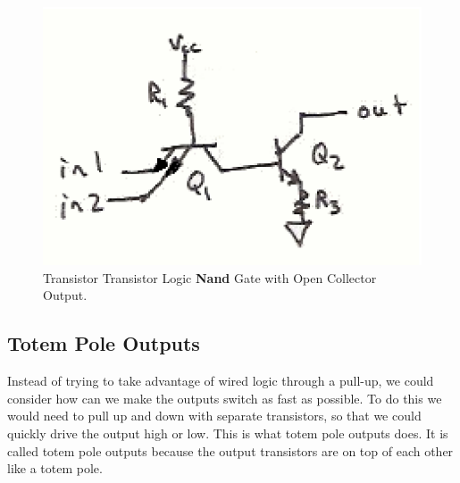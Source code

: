 \begin{figure}
\begin{center}
\caption{Transistor Transistor Logic \textbf{Nand} Gate with Open Collector Output.}\label{f:TTL_nand_opencollector}
\includegraphics{images/TTLnand_opencollector.eps}
\end{center}
\end{figure}

\subsection{Totem Pole Outputs}
Instead of trying to take advantage of wired logic through a pull-up, we could consider how can we make the outputs switch as fast as possible.  To do this we would need to pull up and down with separate transistors, so that we could quickly drive the output high or low.  This is what totem pole outputs does.  It is called totem pole outputs because the output transistors are on top of each other like a totem pole.

